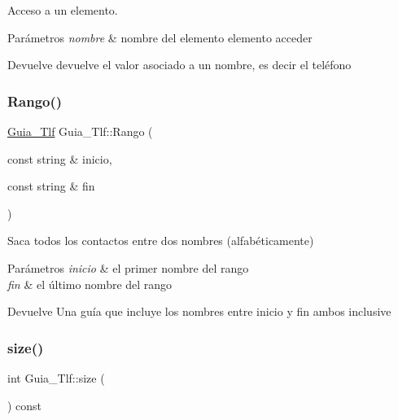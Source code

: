 Acceso a un elemento. 


\begin{DoxyParams}{Parámetros}
{\em nombre} & nombre del elemento elemento acceder \\
\hline
\end{DoxyParams}
\begin{DoxyReturn}{Devuelve}
devuelve el valor asociado a un nombre, es decir el teléfono 
\end{DoxyReturn}
\mbox{\label{classGuia__Tlf_a9d954f8383fca465ea79e4b78779c53f}} 
\subsubsection{\texorpdfstring{Rango()}{Rango()}}
{\footnotesize\ttfamily \hyperlink{classGuia__Tlf}{Guia\+\_\+\+Tlf} Guia\+\_\+\+Tlf\+::\+Rango (\begin{DoxyParamCaption}\item[{const string \&}]{inicio,  }\item[{const string \&}]{fin }\end{DoxyParamCaption})\hspace{0.3cm}{\ttfamily [inline]}}



Saca todos los contactos entre dos nombres (alfabéticamente) 


\begin{DoxyParams}{Parámetros}
{\em inicio} & el primer nombre del rango \\
\hline
{\em fin} & el último nombre del rango \\
\hline
\end{DoxyParams}
\begin{DoxyReturn}{Devuelve}
Una guía que incluye los nombres entre inicio y fin ambos inclusive 
\end{DoxyReturn}
\mbox{\label{classGuia__Tlf_a727ab46d490b4196a71f623644906a81}} 
\subsubsection{\texorpdfstring{size()}{size()}}
{\footnotesize\ttfamily int Guia\+\_\+\+Tlf\+::size (\begin{DoxyParamCaption}{ }\end{DoxyParamCaption}) const\hspace{0.3cm}{\ttfamily [inline]}}




